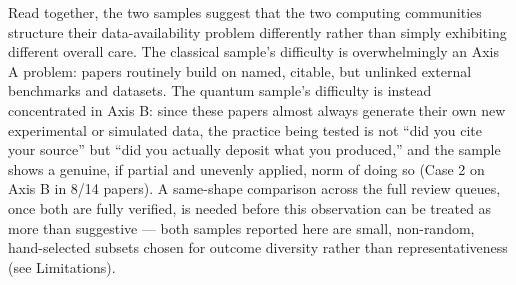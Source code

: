 Read together, the two samples suggest that the two computing communities structure
their data-availability problem differently rather than simply exhibiting different
overall care. The classical sample's difficulty is overwhelmingly an Axis A problem:
papers routinely build on named, citable, but unlinked external benchmarks and
datasets. The quantum sample's difficulty is instead concentrated in Axis B: since these
papers almost always generate their own new experimental or simulated data, the
practice being tested is not ``did you cite your source'' but ``did you actually deposit
what you produced,'' and the sample shows a genuine, if partial and unevenly applied,
norm of doing so (Case 2 on Axis B in 8/14 papers). A same-shape comparison across the
full review queues, once both are fully verified, is needed before this observation can
be treated as more than suggestive --- both samples reported here are small,
non-random, hand-selected subsets chosen for outcome diversity rather than
representativeness (see Limitations).

